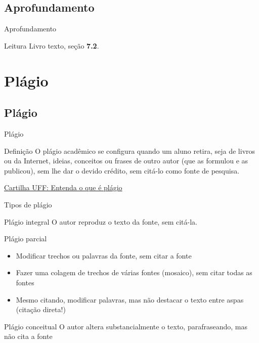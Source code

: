 \documentclass{beamer}
\begin{document}
\subsection{Aprofundamento}

\begin{frame}{Aprofundamento}
  \begin{block}{Leitura}
    Livro texto, seção {\bf 7.2}.
  \end{block}
\end{frame}

\section{Plágio}

\subsection{Plágio}

\begin{frame}{Plágio}
  \begin{block}{Definição}
    \footnotesize
    O plágio acadêmico se configura quando um aluno retira, seja de
    livros ou da Internet, ideias, conceitos ou frases de outro autor
    (que as formulou e as publicou), sem lhe dar o devido crédito, sem
    citá-lo como fonte de pesquisa.
  \end{block}

  \vfill
  \scriptsize
  \hfill \href{{http://www.noticias.uff.br/arquivos/cartilha-sobre-plagio-academico.pdf}}
  {Cartilha UFF: Entenda o que é plágio}
\end{frame}

\begin{frame}{Tipos de plágio}
  \begin{block}{Plágio integral}
    \footnotesize
    O autor \alert{reproduz} o texto da fonte, sem citá-la.
  \end{block}
  \bigskip
  \begin{block}{Plágio parcial}
    \begin{itemize}
      \footnotesize
    \item Modificar trechos ou palavras da fonte, sem citar a fonte
    \item Fazer uma colagem de trechos de várias fontes (mosaico), sem
      citar \alert{todas} as fontes
    \item \alert{Mesmo citando}, modificar palavras, mas não destacar
      o texto entre aspas (citação direta!)
    \end{itemize}
  \end{block}
  \bigskip
  \begin{block}{Plágio conceitual}
    \footnotesize
    O autor altera substancialmente o texto, parafraseando, mas não
    cita a fonte
  \end{block}
\end{frame}
\end{document}
